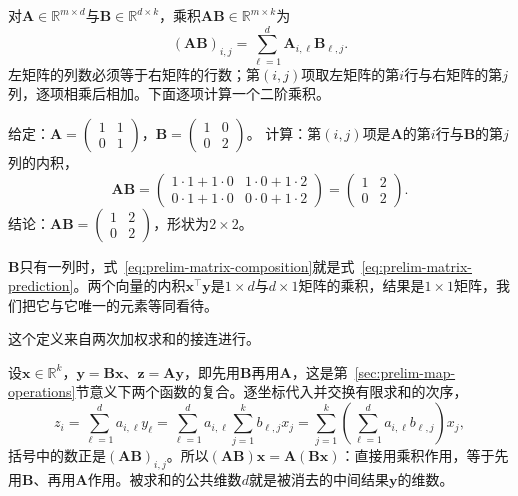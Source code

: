 对$\bm A\in\mathbb R^{m\times d}$与$\bm B\in\mathbb R^{d\times k}$，乘积$\bm A\bm B\in\mathbb R^{m\times k}$为
\begin{equation}
 (\bm A\bm B)_{i,j}=\sum_{\ell=1}^d\bm A_{i,\ell}\bm B_{\ell,j}.
 \label{eq:prelim-matrix-composition}
\end{equation}
左矩阵的列数必须等于右矩阵的行数；第$(i,j)$项取左矩阵的第$i$行与右矩阵的第$j$列，逐项相乘后相加。下面逐项计算一个二阶乘积。
\begin{example}[二阶矩阵的乘积]
\label{ex:ls-matrix-product-2x2}
给定：$\bm A=\left(\begin{smallmatrix}1&1\\0&1\end{smallmatrix}\right)$，$\bm B=\left(\begin{smallmatrix}1&0\\0&2\end{smallmatrix}\right)$。
计算：第$(i,j)$项是$\bm A$的第$i$行与$\bm B$的第$j$列的内积，
\[
 \bm A\bm B
 =\begin{pmatrix}1\cdot1+1\cdot0&1\cdot0+1\cdot2\\0\cdot1+1\cdot0&0\cdot0+1\cdot2\end{pmatrix}
 =\begin{pmatrix}1&2\\0&2\end{pmatrix}.
\]
结论：$\bm A\bm B=\left(\begin{smallmatrix}1&2\\0&2\end{smallmatrix}\right)$，形状为$2\times2$。
\end{example}
$\bm B$只有一列时，式~\eqref{eq:prelim-matrix-composition}就是式~\eqref{eq:prelim-matrix-prediction}。两个向量的内积$\bm x^\top\bm y$是$1\times d$与$d\times1$矩阵的乘积，结果是$1\times1$矩阵，我们把它与它唯一的元素等同看待。

这个定义来自两次加权求和的接连进行。

设$\bm x\in\mathbb R^k$，$\bm y=\bm B\bm x$、$\bm z=\bm A\bm y$，即先用$\bm B$再用$\bm A$，这是第~\ref{sec:prelim-map-operations}节意义下两个函数的复合。逐坐标代入并交换有限求和的次序，
\begin{equation}
 z_i=\sum_{\ell=1}^d a_{i,\ell}y_\ell
 =\sum_{\ell=1}^d a_{i,\ell}\sum_{j=1}^k b_{\ell,j}x_j
 =\sum_{j=1}^k\left(\sum_{\ell=1}^d a_{i,\ell}b_{\ell,j}\right)x_j,
 \label{eq:linear-algebra-matrix-product}
\end{equation}
括号中的数正是$(\bm A\bm B)_{i,j}$。所以$(\bm A\bm B)\bm x=\bm A(\bm B\bm x)$：直接用乘积作用，等于先用$\bm B$、再用$\bm A$作用。被求和的公共维数$d$就是被消去的中间结果$\bm y$的维数。

